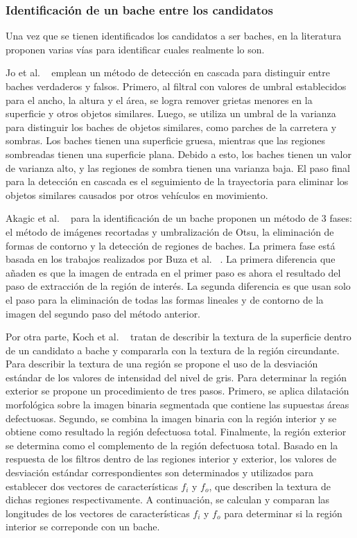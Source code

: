 		\subsubsection{Identificación de un bache entre los candidatos}
		Una vez que se tienen identificados los candidatos a ser baches, en la literatura proponen varias vías para  
		identificar cuales realmente lo son.

		Jo et al. ~ emplean un método de detección en cascada para distinguir
		entre baches verdaderos y falsos. Primero, al filtral con valores de umbral establecidos para el ancho, la
		altura y el área, se logra remover grietas menores en la superficie y otros objetos similares. Luego, 
		se utiliza un umbral de la varianza para distinguir los baches de objetos similares, como parches de 
		la carretera y sombras. Los baches tienen una superficie gruesa, mientras que las regiones sombreadas 
		tienen una superficie plana. Debido a esto, los baches tienen un valor de varianza alto, y las regiones 
		de sombra tienen una varianza baja. El paso final para la detección en cascada es el seguimiento de 
		la trayectoria para eliminar los objetos similares causados por otros vehículos en movimiento. 
		

		Akagic et al. ~ para la identificación de un bache proponen un método de 3 fases:
		el método de imágenes recortadas y umbralización de Otsu, la eliminación de formas de contorno y la detección 
		de regiones de baches. La primera fase está basada en los trabajos realizados por  Buza et al. ~.
		La primera diferencia que añaden es que la imagen de entrada en el primer paso es ahora el resultado del paso de extracción 
		de la región de interés. La segunda diferencia es que usan solo el paso para la eliminación de todas las formas lineales y de 
		contorno de la imagen del segundo paso del método anterior.


		Por otra parte, Koch et al. ~ tratan de describir la textura de la superficie dentro de un candidato a bache y 
		compararla con la textura de la región circundante. Para describir la textura de una región se propone el uso de la desviación estándar de 
		los valores de intensidad del nivel de gris. Para determinar la región exterior se propone un  procedimiento de tres pasos. Primero, se 
		aplica dilatación morfológica sobre la imagen binaria segmentada que contiene las supuestas áreas defectuosas. Segundo, se combina la 
		imagen binaria con la región interior y se obtiene como resultado la región defectuosa total. Finalmente, la región exterior se determina 
		como el complemento de la región defectuosa total. Basado en la respuesta de los filtros dentro de las regiones interior y exterior, los 
		valores de desviación estándar correspondientes son determinados y utilizados para establecer dos vectores de características $f_i$ y $f_o$, 
		que describen la textura de dichas regiones respectivamente. A continuación, se calculan y comparan las longitudes de los vectores de 
		características $f_i$ y $f_o$ para determinar si la región interior se correponde con un bache.
		
